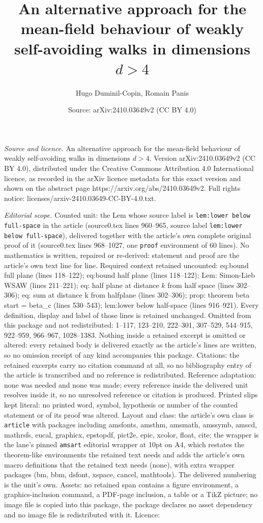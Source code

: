 \documentclass[10pt,a4paper]{amsart}
\title[An alternative approach for the mean-field behaviour of weak]{An alternative approach for the mean-field behaviour of weakly self-avoiding walks in dimensions $d>4$}
\author{Hugo Duminil-Copin, Romain Panis}
\date{Source: arXiv:2410.03649v2 (CC BY 4.0)}
\begin{document}
\maketitle

\noindent\emph{Source and licence.} An alternative approach for the mean-field behaviour of weakly self-avoiding walks in dimensions $d>4$. Version arXiv:2410.03649v2 (CC BY 4.0), distributed under the Creative Commons Attribution 4.0 International licence, as recorded in the arXiv licence metadata for this exact version and shown on the abstract page https://arxiv.org/abs/2410.03649v2. Full rights notice: licenses/arxiv-2410.03649-CC-BY-4.0.txt.\par\smallskip

\noindent\textit{Editorial scope.} Counted unit: the Lem whose source label is \texttt{lem:lower below full-space} in the article (source0.tex lines 960--965, source label \texttt{lem:lower below full-space}), delivered together with the article's own complete original proof of it (source0.tex lines 968--1027, one \texttt{proof} environment of 60 lines). No mathematics is written, repaired or re-derived: statement and proof are the article's own text line for line. Required context retained uncounted: eq:bound full plane (lines 118--122); eq:bound half plane (lines 118--122); Lem: Simon-Lieb WSAW (lines 211--221); eq: half plane at distance $k$ from half space (lines 302--306); eq: sum at distance k from halfplane (lines 302--306); prop: theorem beta start = beta\_c (lines 530--543); lem:lower below half-space (lines 916--921). Every definition, display and label of those lines is retained unchanged. Omitted from this package and not redistributed: 1--117, 123--210, 222--301, 307--529, 544--915, 922--959, 966--967, 1028--1383. Nothing inside a retained excerpt is omitted or altered: every retained body is delivered exactly as the article's lines are written, so no omission receipt of any kind accompanies this package. Citations: the retained excerpts carry no citation command at all, so no bibliography entry of the article is transcribed and no reference is redistributed. Reference adaptation: none was needed and none was made; every reference inside the delivered unit resolves inside it, so no unresolved reference or citation is produced. Printed slips kept literal: no printed word, symbol, hypothesis or number of the counted statement or of its proof was altered. Layout and class: the article's own class is \texttt{article} with packages including amsfonts, amsthm, amsmath, amssymb, amscd, mathrsfs, eucal, graphicx, epstopdf, pict2e, epic, xcolor, float, cite; the wrapper is the lane's pinned \texttt{amsart} editorial wrapper at 10pt on A4, which restates the theorem-like environments the retained text needs and adds the article's own macro definitions that the retained text needs (none), with extra wrapper packages (bm, bbm, dsfont, xspace, cancel, mathtools). The delivered numbering is the unit's own. Assets: no retained span contains a figure environment, a graphics-inclusion command, a PDF-page inclusion, a table or a TikZ picture; no image file is copied into this package, the package declares no asset dependency and no image file is redistributed with it. Licence: 
\end{document}
